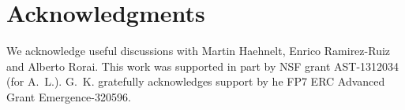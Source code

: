 \documentclass[a4paper,fleqn,usenatbib]{mnras}
\begin{document}
\section*{Acknowledgments}

We acknowledge useful discussions with Martin Haehnelt, Enrico
Ramirez-Ruiz and Alberto Rorai.  This work was supported in part by
NSF grant AST-1312034 (for A.~L.).  G.~K. gratefully acknowledges
support by he FP7 ERC Advanced Grant Emergence-320596.


 

\bsp
\label{lastpage}
\end{document}
